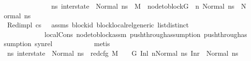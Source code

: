 \begin{isabellebody}
\ \ \ \ \ \ \ \ \ \ \ \ \ \ {\isacharparenleft}{\kern0pt}{\isasymforall}ns{}{\isacharprime}{\kern0pt}{\isachardot}{\kern0pt}\ inter{\isacharunderscore}{\kern0pt}state\ {\isacharequal}{\kern0pt}\ Normal\ ns{}{\isacharprime}{\kern0pt}\ {\isasymlongrightarrow}\ {\isacharparenleft}{\kern0pt}M{\isacharcomma}{\kern0pt}{\isasymLambda}{\isacharcomma}{\kern0pt}{\isasymGamma}{\isacharcomma}{\kern0pt}{\isasymOmega}\ {\isasymturnstile}\ {\isasymlangle}node{\isacharunderscore}{\kern0pt}to{\isacharunderscore}{\kern0pt}block{\isacharparenleft}{\kern0pt}G{\isacharparenright}{\kern0pt}\ {\isacharbang}{\kern0pt}\ n{\isacharcomma}{\kern0pt}\ Normal\ ns{}{\isasymrangle}\ {\isacharbrackleft}{\kern0pt}{\isasymrightarrow}{\isacharbrackright}{\kern0pt}\ Normal\ ns{}{\isacharprime}{\kern0pt}{\isacharparenright}{\kern0pt}{\isacharparenright}{\kern0pt}{\isachardoublequoteclose}\isanewline
\ \ \ \ \ \ \ \ \ \ \isamarkupfalse%
\ Red{\isacharunderscore}{\kern0pt}impl\ {\isacartoucheopen}cs{}\ {\isasymnoteq}\ {\isacharbrackleft}{\kern0pt}{\isacharbrackright}{\kern0pt}{\isacartoucheclose}\ assms{\isacharparenleft}{\kern0pt}{}{\isacharparenright}{\kern0pt}\ block{\isacharunderscore}{\kern0pt}id\ block{\isacharunderscore}{\kern0pt}local{\isacharunderscore}{\kern0pt}rel{\isacharunderscore}{\kern0pt}generic\ list{\isachardot}{\kern0pt}distinct{\isacharparenleft}{\kern0pt}{}{\isacharparenright}{\kern0pt}\ \isanewline
\ \ \ \ \ \ \ \ \ \ \ \ local{\isachardot}{\kern0pt}Cons\ node{\isacharunderscore}{\kern0pt}to{\isacharunderscore}{\kern0pt}block{\isacharunderscore}{\kern0pt}assm\ push{\isacharunderscore}{\kern0pt}through{\isacharunderscore}{\kern0pt}assumption{}\ push{\isacharunderscore}{\kern0pt}through{\isacharunderscore}{\kern0pt}assumption{}\ syn{\isacharunderscore}{\kern0pt}rel\isanewline
\ \ \ \ \ \ \ \ \ \ \isamarkupfalse%
\ metis\isanewline
\isanewline
\ \ \ \ \ \ \ \ \isamarkupfalse%
\ {\isachardoublequoteopen}{\isacharparenleft}{\kern0pt}{\isasymforall}ns{}{\isacharprime}{\kern0pt}{\isachardot}{\kern0pt}\ inter{\isacharunderscore}{\kern0pt}state\ {\isacharequal}{\kern0pt}\ Normal\ ns{}{\isacharprime}{\kern0pt}\ {\isasymlongrightarrow}\ red{\isacharunderscore}{\kern0pt}cfg\ M\ {\isasymLambda}\ {\isasymGamma}\ {\isasymOmega}\ G\ {\isacharparenleft}{\kern0pt}{\isacharparenleft}{\kern0pt}Inl\ n{\isacharparenright}{\kern0pt}{\isacharcomma}{\kern0pt}{\isacharparenleft}{\kern0pt}Normal\ ns{}{\isacharparenright}{\kern0pt}{\isacharparenright}{\kern0pt}\ {\isacharparenleft}{\kern0pt}Inr\ {\isacharparenleft}{\kern0pt}{\isacharparenright}{\kern0pt}{\isacharcomma}{\kern0pt}\ Normal\ ns{}{\isacharprime}{\kern0pt}{\isacharparenright}{\kern0pt}{\isacharparenright}{\kern0pt}{\isachardoublequoteclose}\isanewline

\end{isabellebody}
